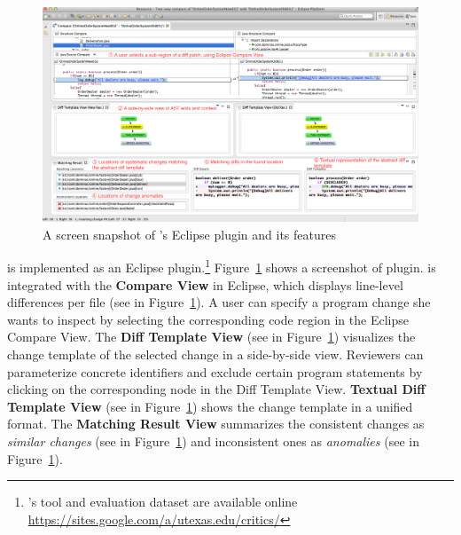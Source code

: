 \documentclass[runningheads,a4paper]{llncs}
\begin{document}
\begin{figure}[ht]
 \centering
 \includegraphics[width=\textwidth]{images/critics-UI.pdf}
 \caption{A screen snapshot of {\critics}'s Eclipse plugin and its features}
 \label{fig:critics-UI}
\end{figure}

{\critics} is implemented as an Eclipse plugin.\footnote{{\critics}'s tool and evaluation dataset are available online \url{https://sites.google.com/a/utexas.edu/critics/}} Figure~\ref{fig:critics-UI} shows a screenshot of {\critics} plugin. {\critics} is integrated with the {\bf Compare View} in Eclipse, which displays line-level differences per file (see  in Figure~\ref{fig:critics-UI}). A user can specify a program change she wants to inspect by selecting the corresponding code region in the Eclipse Compare View. The {\bf Diff Template View} (see  in Figure~\ref{fig:critics-UI}) visualizes the change template of the selected change in a side-by-side view. Reviewers can parameterize concrete identifiers and exclude certain program statements by clicking on the corresponding node in the Diff Template View. {\bf Textual Diff Template View} (see  in Figure~\ref{fig:critics-UI}) shows the change template in a unified format. The {\bf Matching Result View} summarizes the consistent changes as {\em similar changes} (see  in Figure~\ref{fig:critics-UI}) and inconsistent ones as {\em anomalies} (see  in Figure~\ref{fig:critics-UI}).
\end{document}
